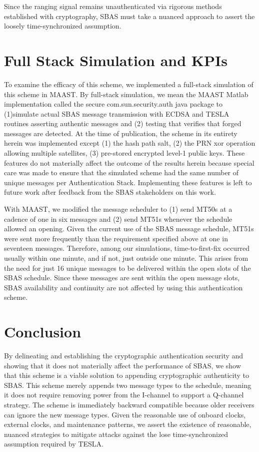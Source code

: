 \documentclass[letterpaper,times]{IONconf/IONconf}
\begin{document}
Since the ranging signal remains unauthenticated via rigorous methods established with cryptography, SBAS must take a nuanced approach to assert the loosely time-synchronized assumption.

\section{Full Stack Simulation and KPIs} \label{sec: experiment}

To examine the efficacy of this scheme, we implemented a full-stack simulation of this scheme in MAAST.
By full-stack simulation, we mean the MAAST Matlab implementation called the secure com.sun.security.auth java package to (1)simulate actual SBAS message transmission with ECDSA and TESLA routines asserting authentic messages and (2) testing that verifies that forged messages are detected.
At the time of publication, the scheme in its entirety herein was implemented except (1) the hash path salt, (2) the PRN xor operation allowing multiple satellites, (3) pre-stored encrypted level-1 public keys.
These features do not materially affect the outcome of the results herein because special care was made to ensure that the simulated scheme had the same number of unique messages per Authentication Stack.
Implementing these features is left to future work after feedback from the SBAS stakeholders on this work.

With MAAST, we modified the message scheduler to (1) send MT50s at a cadence of one in six messages and (2) send MT51s whenever the schedule allowed an opening.
Given the current use of the SBAS message schedule, MT51s were sent more frequently than the requirement specified above at one in seventeen messages.
Therefore, among our simulations, time-to-first-fix occurred usually within one minute, and if not, just outside one minute.
This arises from the need for just 16 unique messages to be delivered within the open slots of the SBAS schedule.
Since these messages are sent within the open message slots, SBAS availability and continuity are not affected by using this authentication scheme.

\section{Conclusion}

By delineating and establishing the cryptographic authentication security and showing that it does not materially affect the performance of SBAS, we show that this scheme is a viable solution to appending cryptographic authenticity to SBAS.
This scheme merely appends two message types to the schedule, meaning it does not require removing power from the I-channel to support a Q-channel strategy.
The scheme is immediately backward compatible because older receivers can ignore the new message types.
Given the reasonable use of onboard clocks, external clocks, and maintenance patterns, we assert the existence of reasonable, nuanced strategies to mitigate attacks against the lose time-synchronized assumption required by TESLA.



\end{document}
